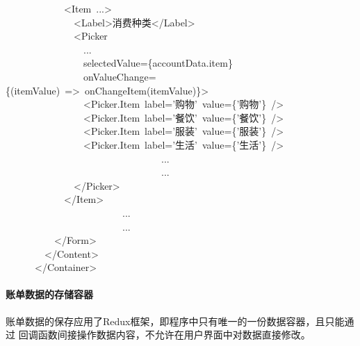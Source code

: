 \documentclass{article}
\begin{document}
\begin{mdpre}
~~~~~~~~~~~~\textless{}Item~...\textgreater{}\\
~~~~~~~~~~~~~~\textless{}Label\textgreater{}消费种类\textless{}/Label\textgreater{}\\
~~~~~~~~~~~~~~\textless{}Picker\\
~~~~~~~~~~~~~~~~...\\
~~~~~~~~~~~~~~~~selectedValue=\{accountData.item\}\\
~~~~~~~~~~~~~~~~onValueChange=\{(itemValue)~=\textgreater{}~onChangeItem(itemValue)\}\textgreater{}\\
~~~~~~~~~~~~~~~~\textless{}Picker.Item~label={'}{购物}{'}~value=\{{'}{购物}{'}\}~/\textgreater{}\\
~~~~~~~~~~~~~~~~\textless{}Picker.Item~label={'}{餐饮}{'}~value=\{{'}{餐饮}{'}\}~/\textgreater{}\\
~~~~~~~~~~~~~~~~\textless{}Picker.Item~label={'}{服装}{'}~value=\{{'}{服装}{'}\}~/\textgreater{}\\
~~~~~~~~~~~~~~~~\textless{}Picker.Item~label={'}{生活}{'}~value=\{{'}{生活}{'}\}~/\textgreater{}\\
~~~~~~~~~~~~~~~~~~~~~~~~~~~~~~~~...\\
~~~~~~~~~~~~~~~~~~~~~~~~~~~~~~~~...\\
~~~~~~~~~~~~~~\textless{}/Picker\textgreater{}\\
~~~~~~~~~~~~\textless{}/Item\textgreater{}\\
~~~~~~~~~~~~~~~~~~~~~~~~...\\
~~~~~~~~~~~~~~~~~~~~~~~~...\\
~~~~~~~~~~\textless{}/Form\textgreater{}\\
~~~~~~~~\textless{}/Content\textgreater{}\\
~~~~~~\textless{}/Container\textgreater{}%
\end{mdpre}
\paragraph{账单数据的存储容器}\label{section}%

\noindent{}账单数据的保存应用了Redux框架，即程序中只有唯一的一份数据容器，且只能通过
回调函数间接操作数据内容，不允许在用户界面中对数据直接修改。%
\end{document}
